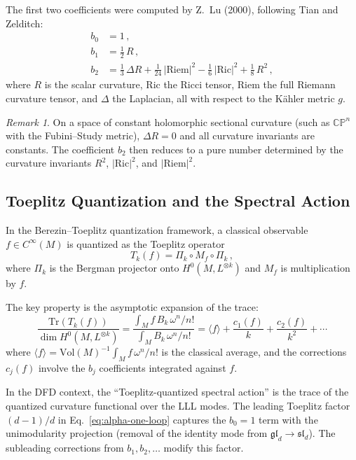 \documentclass[12pt,a4paper]{article}
\theoremstyle{definition}
\theoremstyle{remark}
\newtheorem{remark}{Remark}
\newcommand{\CP}{\mathbb{CP}}
\newcommand{\Tr}{\mathrm{Tr}}
\newcommand{\Ric}{\mathrm{Ric}}
\newcommand{\Riem}{\mathrm{Riem}}
\newcommand{\inv}{^{-1}}
\begin{document}
The first two coefficients were computed by Z.~Lu (2000), following Tian and
Zelditch:
\begin{align}
b_0 &= 1\,,
\label{eq:b0}\\
b_1 &= \tfrac{1}{2}\,R\,,
\label{eq:b1}\\
b_2 &= \tfrac{1}{3}\,\Delta R
  + \tfrac{1}{24}\,|\Riem|^2
  - \tfrac{1}{6}\,|\Ric|^2
  + \tfrac{1}{8}\,R^2\,,
\label{eq:b2}
\end{align}
where $R$ is the scalar curvature, $\Ric$ the Ricci tensor, $\Riem$ the
full Riemann curvature tensor, and $\Delta$ the Laplacian, all with respect
to the K\"ahler metric $g$.

\begin{remark}
On a space of constant holomorphic sectional curvature (such as $\CP^n$
with the Fubini--Study metric), $\Delta R = 0$ and all curvature invariants
are constants. The coefficient $b_2$ then reduces to a pure number
determined by the curvature invariants $R^2$, $|\Ric|^2$, and $|\Riem|^2$.
\end{remark}

\subsection{Toeplitz Quantization and the Spectral Action}

In the Berezin--Toeplitz quantization framework, a classical observable
$f \in C^\infty(M)$ is quantized as the Toeplitz operator
\begin{equation}
T_k(f) = \Pi_k \circ M_f \circ \Pi_k\,,
\end{equation}
where $\Pi_k$ is the Bergman projector onto $H^0(M, L^{\otimes k})$ and
$M_f$ is multiplication by $f$.

The key property is the asymptotic expansion of the trace:
\begin{equation}
\label{eq:trace-expansion}
\frac{\Tr(T_k(f))}{\dim H^0(M, L^{\otimes k})}
= \frac{\int_M f\, B_k \,\omega^n/n!}{\int_M B_k\, \omega^n/n!}
= \langle f \rangle + \frac{c_1(f)}{k} + \frac{c_2(f)}{k^2} + \cdots
\end{equation}
where $\langle f \rangle = \mathrm{Vol}(M)\inv \int_M f\, \omega^n/n!$ is
the classical average, and the corrections $c_j(f)$ involve the $b_j$
coefficients integrated against $f$.

In the DFD context, the ``Toeplitz-quantized spectral action'' is the
trace of the quantized curvature functional over the LLL modes. The leading
Toeplitz factor $(d-1)/d$ in Eq.~\eqref{eq:alpha-one-loop} captures the
$b_0 = 1$ term with the unimodularity projection (removal of the identity
mode from $\mathfrak{gl}_d \to \mathfrak{sl}_d$). The subleading
corrections from $b_1, b_2, \ldots$ modify this factor.
\end{document}
